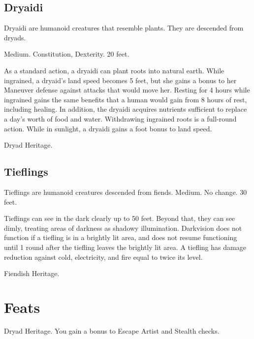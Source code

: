 \subsection{Dryaidi}

Dryaidi are humanoid creatures that resemble plants. They are descended from dryads.

 Medium.
  Constitution,  Dexterity.
 20 feet.
\begin{itemize}
     As a standard action, a dryaidi can plant roots into natural earth. While ingrained, a dryaid's land speed becomes 5 feet, but she gains a  bonus to her Maneuver defense against attacks that would move her. Resting for 4 hours while ingrained gains the same benefits that a human would gain from 8 hours of rest, including healing. In addition, the dryaidi acquires nutrients sufficient to replace a day's worth of food and water. Withdrawing ingrained roots is a full-round action.
     While in sunlight, a dryaidi gains a  foot bonus to land speed.
\end{itemize}
 Dryad Heritage.

\subsection{Tieflings}

Tieflings are humanoid creatures descended from fiends.
 Medium.
 No change.
 30 feet.
\begin{itemize}
     Tieflings can see in the dark clearly up to 50 feet. Beyond that, they can see dimly, treating areas of darkness as shadowy illumination. Darkvision does not function if a tiefling is in a brightly lit area, and does not resume functioning until 1 round after the tiefling leaves the brightly lit area.
     A tiefling has damage reduction against cold, electricity, and fire equal to twice its level.
\end{itemize}
 Fiendish Heritage.

\section{Feats}

\featpre Dryad Heritage.
\featben You gain a  bonus to Escape Artist and Stealth checks.

